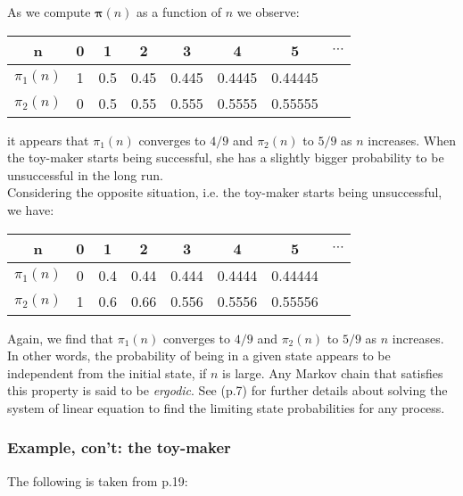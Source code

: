 \documentclass[\main/main.tex]{subfiles}
\begin{document}
\begin{small}
\noindent As we compute $\bm{\pi}(n)$ as a function of $n$ we observe:

\begin{center} 
\begin{tabular}{ c|c|c|c|c|c|c|c  } 
 n & 0 & 1 & 2 & 3& 4 & 5 &$\cdots$ \\ 
  \hline
 $\pi_1(n)$ & 1& 0.5& 0.45& 0.445& 0.4445&0.44445 \\ 
 $\pi_2(n)$  & 0 & 0.5  & 0.55&0.555 &0.5555&0.55555\\ 
\end{tabular}
\end{center}
it appears that $\pi_1(n)$ converges to $4/9$ and $\pi_2(n)$ to $5/9$ as $n$ increases. When the toy-maker starts being successful, she has a slightly bigger probability to be unsuccessful in the long run.  \\

\noindent Considering the opposite situation, i.e. the toy-maker starts being unsuccessful, we have:

\begin{center} 
\begin{tabular}{ c|c|c|c|c|c|c|c  } 
 n & 0 & 1 & 2 & 3& 4 & 5 &$\cdots$ \\ 
  \hline
 $\pi_1(n)$ & 0& 0.4& 0.44& 0.444& 0.4444&0.44444 \\ 
 $\pi_2(n)$  & 1 & 0.6  & 0.66 &0.556 &0.5556&0.55556\\ 
\end{tabular}
\end{center}
Again, we find that $\pi_1(n)$ converges to $4/9$ and $\pi_2(n)$ to $5/9$ as $n$ increases. In other words, the probability of being in a given state appears to be independent from the initial state, if $n$ is large. Any Markov chain that satisfies this property is said to be \textit{ergodic}. See \cite{Howard1960} (p.7) for further details about solving the system of linear equation to find the limiting state probabilities for any process.

\end{small}


\subsubsection{Example, con't: the toy-maker \citep{Howard1960}}

The following is taken from \cite{Howard1960} p.19:
\end{document}
